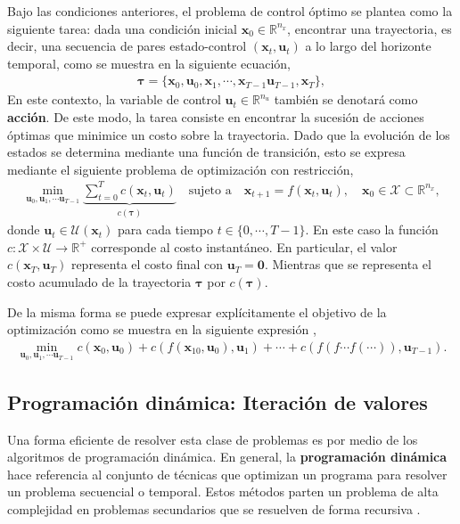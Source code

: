 Bajo las condiciones anteriores, el problema de control óptimo se plantea como la siguiente tarea: dada una condición inicial $\mathbf{x}_{0}\in\mathbb{R}^{n_x}$, encontrar una trayectoria, es decir, una secuencia de pares estado-control $(\mathbf{x}_t, \mathbf{u}_t)$ a lo largo del horizonte temporal, como se muestra en la siguiente ecuación,
\begin{align}
    \bm\tau = \{\mathbf{x}_{0}, \mathbf{u}_0, \mathbf{x}_1, \cdots, \mathbf{x}_{T-1}\mathbf{u}_{T-1}, \mathbf{x}_{T}\},
\end{align}
En este contexto, la variable de control $\mathbf{u}_t\in\mathbb{R}^{n_u}$ también se denotará como \textbf{acción}. De este modo, la tarea consiste en encontrar la sucesión de acciones óptimas que minimice un costo sobre la trayectoria. Dado que la evolución de los estados se determina mediante una función de transición, esto se expresa mediante el siguiente problema de optimización con restricción,
\begin{align}
\min_{\mathbf{u}_0, \mathbf{u}_1, \cdots \mathbf{u}_{T-1}}
\underbrace{\sum_{t=0}^{T} c(\mathbf{x}_t, \mathbf{u}_t)}_{c(\bm\tau)} \quad \text{sujeto a} \quad \mathbf{x}_{t+1}= f(\mathbf{x}_{t}, \mathbf{u}_{t}), \quad \mathbf{x}_{0}\in \mathcal{X}\subset\mathbb{R}^{n_x},
\label{eq:OC_objective}
\end{align}
donde $\mathbf{u}_t \in \mathcal{U}(\mathbf{x}_t)$ para cada tiempo $t\in \{0, \cdots, T-1\}$. En este caso la función $c:\mathcal{X}\times\mathcal{U}\rightarrow\mathbb{R}^{+}$ corresponde al costo instantáneo. En particular, el valor $c(\mathbf{x}_{T}, \mathbf{u}_{T})$ representa el costo final con $\mathbf{u}_{T}=\bm{0}$. Mientras que se representa el costo acumulado de la trayectoria $\bm\tau$ por $c(\bm\tau)$. \cite{underactuated}

De la misma forma se puede expresar explícitamente el objetivo de la optimización como se muestra en la siguiente expresión \cite{underactuated},
\begin{align}
    \min_{\mathbf{u}_0, \mathbf{u}_1, \cdots \mathbf{u}_{T-1}}c(\mathbf{x}_0, \mathbf{u}_0) + c(f(\mathbf{x}_10, \mathbf{u}_0), \mathbf{u}_1) + \cdots + c(f(f\cdots f(\cdots)), 
    \mathbf{u}_{T-1}).
\end{align}
\subsection{Programación dinámica: Iteración de valores}

 Una forma eficiente de resolver esta clase de problemas es por medio de los algoritmos de  programación dinámica.  En general, la \textbf{programación dinámica} hace referencia al conjunto de técnicas que optimizan un programa para resolver un problema secuencial o temporal. Estos métodos parten un problema de alta complejidad en problemas secundarios que se resuelven de forma recursiva \cite{silver2015}. 

